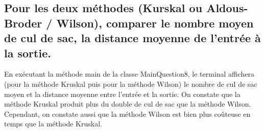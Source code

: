 \documentclass[11pt]{article}
\begin{document}
        \subsection{Pour les deux méthodes (Kurskal ou Aldous-Broder / Wilson),
        comparer le nombre moyen de cul de sac, la distance moyenne de l'entrée à la sortie.}\label{subsec:Q8}
        En exécutant la méthode main de la classe MainQuestion8,
        le terminal affichera (pour la méthode Kruskal puis pour la méthode Wilson)
        le nombre de cul de sac moyen et la distance moyenne entre l'entrée et la sortie.
        On constate que la méthode Kruskal produit plus du double de cul de sac que la méthode Wilson.
        Cependant, on constate aussi que la méthode Wilson est bien plus coûteuse en temps que la méthode Kruskal.
\end{document}
